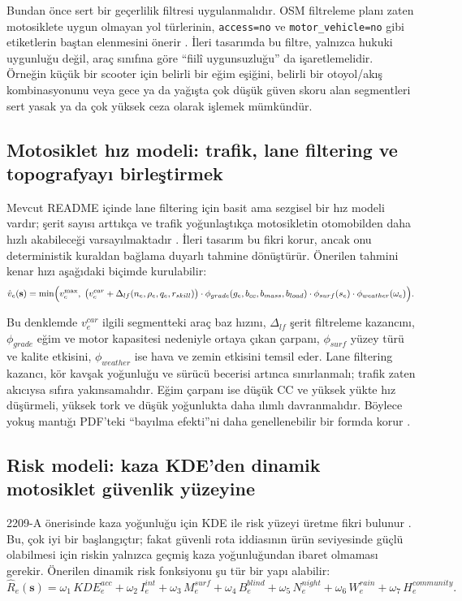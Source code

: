 \documentclass[11pt,a4paper]{article}
\begin{document}
Bundan önce sert bir geçerlilik filtresi uygulanmalıdır. OSM filtreleme planı zaten motosiklete uygun olmayan yol türlerinin, \texttt{access=no} ve \texttt{motor\_vehicle=no} gibi etiketlerin baştan elenmesini önerir \cite{g5}. İleri tasarımda bu filtre, yalnızca hukuki uygunluğu değil, araç sınıfına göre ``fiilî uygunsuzluğu'' da işaretlemelidir. Örneğin küçük bir scooter için belirli bir eğim eşiğini, belirli bir otoyol/akış kombinasyonunu veya gece ya da yağışta çok düşük güven skoru alan segmentleri sert yasak ya da çok yüksek ceza olarak işlemek mümkündür.

\subsection{Motosiklet hız modeli: trafik, lane filtering ve topografyayı birleştirmek}

Mevcut README içinde lane filtering için basit ama sezgisel bir hız modeli vardır; şerit sayısı arttıkça ve trafik yoğunlaştıkça motosikletin otomobilden daha hızlı akabileceği varsayılmaktadır \cite{g1}. İleri tasarım bu fikri korur, ancak onu deterministik kuraldan bağlama duyarlı tahmine dönüştürür. Önerilen tahmini kenar hızı aşağıdaki biçimde kurulabilir:
\[
\hat v_e(\mathbf{s}) = \min\Bigl(v^{\max}_e,\; \bigl(v^{car}_e + \Delta_{lf}(n_e,\rho_e, q_e, r_{skill})\bigr)\cdot \phi_{grade}(g_e, b_{cc}, b_{mass}, b_{load})\cdot \phi_{surf}(s_e)\cdot \phi_{weather}(\omega_e)\Bigr).
\]

Bu denklemde $v^{car}_e$ ilgili segmentteki araç baz hızını, $\Delta_{lf}$ şerit filtreleme kazancını, $\phi_{grade}$ eğim ve motor kapasitesi nedeniyle ortaya çıkan çarpanı, $\phi_{surf}$ yüzey türü ve kalite etkisini, $\phi_{weather}$ ise hava ve zemin etkisini temsil eder. Lane filtering kazancı, kör kavşak yoğunluğu ve sürücü becerisi artınca sınırlanmalı; trafik zaten akıcıysa sıfıra yakınsamalıdır. Eğim çarpanı ise düşük CC ve yüksek yükte hız düşürmeli, yüksek tork ve düşük yoğunlukta daha ılımlı davranmalıdır. Böylece yokuş mantığı PDF'teki ``bayılma efekti''ni daha genellenebilir bir formda korur \cite{u2}.

\subsection{Risk modeli: kaza KDE'den dinamik motosiklet güvenlik yüzeyine}

2209-A önerisinde kaza yoğunluğu için KDE ile risk yüzeyi üretme fikri bulunur \cite{u1}. Bu, çok iyi bir başlangıçtır; fakat güvenli rota iddiasının ürün seviyesinde güçlü olabilmesi için riskin yalnızca geçmiş kaza yoğunluğundan ibaret olmaması gerekir. Önerilen dinamik risk fonksiyonu şu tür bir yapı alabilir:
\[
\hat R_e(\mathbf{s}) = \omega_1\,KDE^{acc}_e + \omega_2\,I^{int}_e + \omega_3\,M^{surf}_e + \omega_4\,B^{blind}_e + \omega_5\,N^{night}_e + \omega_6\,W^{rain}_e + \omega_7\,H^{community}_e.
\]
\end{document}
